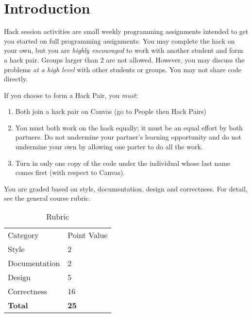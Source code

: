 
\section*{Introduction}

Hack session activities are small weekly programming assignments 
intended to get you started on full programming assignments.  
You may complete the hack on your own, but you are \emph{highly encouraged}
to work with another student and form a hack pair.  Groups larger than
2 are not allowed.  However, you may discuss the problems \emph{at a 
high level} with other students or groups.  You may not share code
directly.  

If you choose to form a Hack Pair, you \emph{must}:
\begin{enumerate}
  \item Both join a hack pair on Canvas (go to People then Hack Pairs)
  \item You must both work on the hack equally; it must be an equal effort
  by both partners.  Do not undermine your partner's learning opportunity and
  do not undermine your own by allowing one parter to do all the work.
  \item Turn in only one copy of the code under the individual whose last
  name comes first (with respect to Canvas).
\end{enumerate}

You are graded based on style, documentation, design and correctness.
For detail, see the general course rubric.

\begin{table}[H]
\center
\begin{tabular}{ll}
Category       & Point Value \\
Style          & 2           \\
Documentation  & 2           \\
Design         & 5           \\
Correctness    & 16          \\
\textbf{Total} & \textbf{25}
\end{tabular}
\caption{Rubric}
\end{table}


